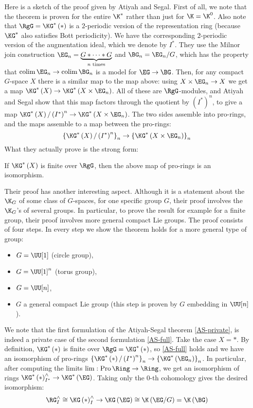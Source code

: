 Here is a sketch of the proof given by Atiyah and Segal.
First of all, we note that the theorem is proven for the entire $\K^*$ rather than just for $\K = \K^0$.
Also note that $\RgG = \KG^*\left(*\right)$ is a $2$-periodic version of the representation ring (because $\KG^*$ also satisfies Bott periodicity).
We have the corresponding $2$-periodic version of the augmentation ideal, which we denote by $I^*$.
They use the Milnor join construction $\EG_n = \underbrace{G * \cdots * G}_{n \text{ times}}$ and $\BG_n = \EG_n/G$, which has the property that $\colim \EG_n \to \colim \BG_n$ is a model for $\EG \to \BG$.
Then, for any compact $G$-space $X$ there is a similar map to the map above: using $X \times \EG_n \to X$ we get a map $\KG^*\left(X\right) \to \KG^*\left(X \times \EG_n\right)$.
All of these are $\RgG$-modules, and Atiyah and Segal show that this map factors through the quotient by $\left(I^*\right)^n$, to give a map $\KG^*\left(X\right)/\left(I^*\right)^n \to \KG^*\left(X \times \EG_n\right)$.
The two sides assemble into pro-rings, and the maps assemble to a map between the pro-rings:
$$
\left\{\KG^*\left(X\right)/\left(I^*\right)^n\right\}_n
\to \left\{\KG^*\left(X \times \EG_n\right)\right\}_n
$$
What they actually prove is the strong form:

\begin{theorem}[{\cite{AS}}]\label{AS-full}
	If $\KG^*\left(X\right)$ is finite over $\RgG$, then the above map of pro-rings is an isomorphism.
\end{theorem}

Their proof has another interesting aspect.
Although it is a statement about the $\K_G$ of some class of $G$-spaces, for one specific group $G$, their proof involves the $\K_G$'s of several groups.
In particular, to prove the result for example for a finite group, their proof involves more general compact Lie groups.
The proof consists of four steps.
In every step we show the theorem holds for a more general type of group:
\begin{itemize}
	\item $G = \UU[1]$ (circle group),
	\item $G = \UU[1]^n$ (torus group),
	\item $G = \UU[n]$,
	\item $G$ a general compact Lie group (this step is proven by $G$ embedding in $\UU[n]$).
\end{itemize}

We note that the first formulation of the Atiyah-Segal theorem \ref{AS-private}, is indeed a private case of the second formulation \ref{AS-full}.
Take the case $X = *$.
By definition, $\KG^*\left(*\right)$ is finite over $\RgG = \KG^*\left(*\right)$, so \ref{AS-full} holds and we have an isomorphism of pro-rings $\left\{\KG^*\left(*\right)/\left(I^*\right)^n\right\}_n \to \left\{\KG^*\left(\EG_n\right)\right\}_n$.
In particular, after computing the limits $\lim: \pro \Ring \to \Ring$, we get an isomorphism of rings $\KG^*\left(*\right)_{I^*}^\wedge \to \KG^*\left(\EG\right)$.
Taking only the $0$-th cohomology gives the desired isomorphism:
$$
\RG_I^\wedge
\cong \KG\left(*\right)_I^\wedge
\to \KG\left(\EG\right)
\cong \K\left(\EG/G\right)
= \K\left(\BG\right)
$$




